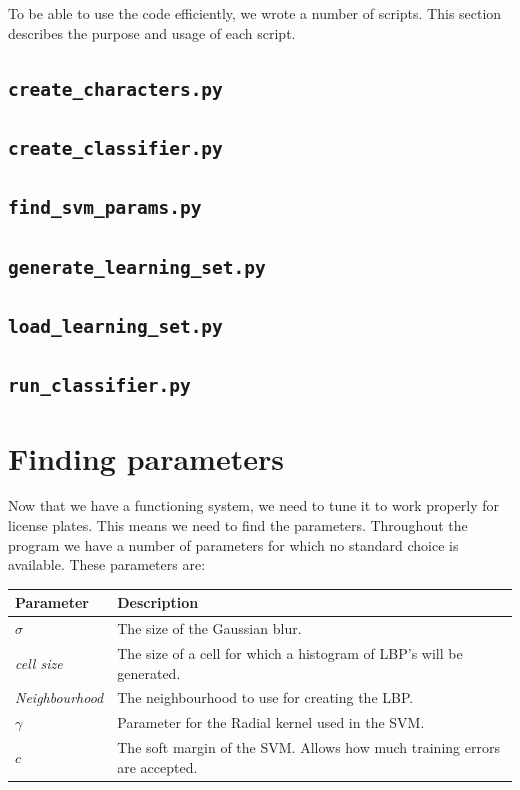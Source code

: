 \documentclass[a4paper]{article}
\begin{document}
To be able to use the code efficiently, we wrote a number of scripts. This
section describes the purpose and usage of each script.

\subsection*{\texttt{create\_characters.py}}



\subsection*{\texttt{create\_classifier.py}}



\subsection*{\texttt{find\_svm\_params.py}}



\subsection*{\texttt{generate\_learning\_set.py}}



\subsection*{\texttt{load\_learning\_set.py}}



\subsection*{\texttt{run\_classifier.py}}



\section{Finding parameters}

Now that we have a functioning system, we need to tune it to work properly for
license plates. This means we need to find the parameters. Throughout the
program we have a number of parameters for which no standard choice is
available. These parameters are:

\begin{tabular}{l|l}
	Parameter 			& Description \\
	\hline
	$\sigma$  			& The size of the Gaussian blur. \\
	\emph{cell size}	& The size of a cell for which a histogram of LBP's
	                      will be generated. \\
	\emph{Neighbourhood}& The neighbourhood to use for creating the LBP. \\
	$\gamma$			& Parameter for the Radial kernel used in the SVM. \\
	$c$					& The soft margin of the SVM. Allows how much training
						  errors are accepted. \\
\end{tabular}
\end{document}
